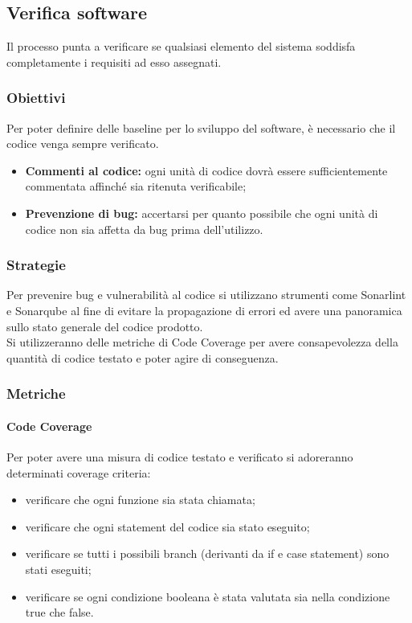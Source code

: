 \documentclass[PianoDiQualifica.tex]{subfiles}
\begin{document}
\subsection{Verifica software}
Il processo punta a verificare se qualsiasi elemento del sistema soddisfa completamente i requisiti ad esso assegnati.
\subsubsection{Obiettivi}
Per poter definire delle baseline per lo sviluppo del software, è necessario che il codice venga sempre verificato.
 \begin{itemize}
 	\item \textbf{Commenti al codice:} ogni unità di codice dovrà essere sufficientemente commentata affinché sia ritenuta verificabile;
 	\item \textbf{Prevenzione di bug:} accertarsi per quanto possibile che ogni unità di codice non sia affetta da bug prima dell'utilizzo.
 \end{itemize}
\subsubsection{Strategie}
Per prevenire bug e vulnerabilità al codice si utilizzano strumenti come Sonarlint e Sonarqube al fine di evitare la propagazione di errori ed avere una panoramica sullo stato generale del codice prodotto.\\
Si utilizzeranno delle metriche di Code Coverage per avere consapevolezza della quantità di codice testato e poter agire di conseguenza.
 
\subsubsection{Metriche}
\paragraph{Code Coverage}
Per poter avere una misura di codice testato e verificato si adoreranno determinati coverage criteria:
\begin{itemize}
	\item {} verificare che ogni funzione sia stata chiamata;
	\item {} verificare che ogni statement del codice sia stato eseguito; 
	\item {} verificare se tutti i possibili branch (derivanti da if e case statement) sono stati eseguiti;
	\item {} verificare se ogni condizione booleana è stata valutata sia nella condizione true che false. 
\end{itemize}
\end{document}
